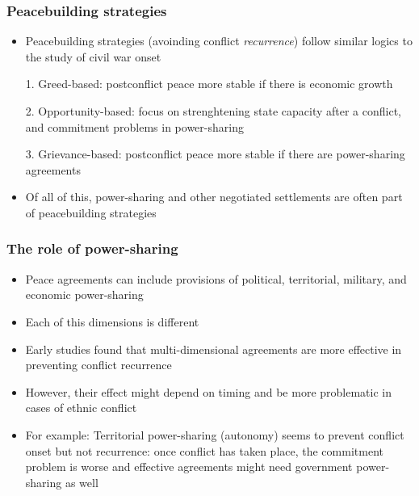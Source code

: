 \documentclass[aspectratio=43]{beamer}
\begin{document}
\begin{frame}
\frametitle{Peacebuilding strategies}
\centering

\begin{itemize}
  \item Peacebuilding strategies (avoinding conflict \textit{recurrence}) follow similar logics to the study of civil war onset
  \item[1.] Greed-based: postconflict peace more stable if there is economic growth
  \item[2.] Opportunity-based: focus on strenghtening state capacity after a conflict, and commitment problems in power-sharing
  \item[3.] Grievance-based: postconflict peace more stable if there are power-sharing agreements
  \item[]
  \item Of all of this, power-sharing and other negotiated settlements are often part of peacebuilding strategies
\end{itemize}

\end{frame}

\begin{frame}
\frametitle{The role of power-sharing}
\centering

\begin{itemize}
  \item Peace agreements can include provisions of political, territorial, military, and economic power-sharing
  \item Each of this dimensions is different
  \item Early studies found that multi-dimensional agreements are more effective in preventing conflict recurrence
  \item However, their effect might depend on timing and be more problematic in cases of ethnic conflict
  \item For example: Territorial power-sharing (autonomy) seems to prevent conflict onset but not recurrence: once conflict has taken place, the commitment problem is worse and effective agreements might need government power-sharing as well
\end{itemize}

\end{frame}
\end{document}
